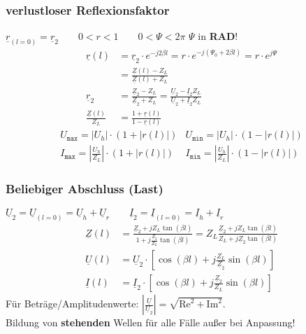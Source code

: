 \subsubsection{verlustloser Reflexionsfaktor}

$ \underline{r}_{(l=0)} = \underline{r}_2 \qquad 0<r<1 \qquad 0<\Psi<2\pi $ $\Psi$ in \textbf{RAD}!
\begin{align*}
	\underline{r}(l)  &= \underline{r}_2 \cdot e^{-j2\beta l} = r \cdot e^{-j(\Psi_0+2\beta l)} =r\cdot e^{j\Psi} \\ &=\tfrac{\underline{Z}(l)-Z_L}{\underline{Z}(l)+Z_L}\\
	\underline{r}_2 & = \tfrac{\underline{Z}_2-Z_L}{\underline{Z}_2+Z_L} = \tfrac{\underline{U}_2-\underline{I}_2Z_L}{\underline{U}_2 +\underline{I}_2 Z_L}\\
	\tfrac{\underline{Z}(l)}{Z_L} & = \tfrac{1+\underline{r}(l)}{1-\underline{r}(l)}
\end{align*}
\begin{align*}
	&U_{\texttt{max}} = |U_h| \cdot (1+|r(l)|) & U_{\texttt{min}} = |U_h| \cdot (1-|r(l)|) &\\
	&I_{\texttt{max}} = \left | \frac{U_h}{Z_L} \right | \cdot (1+|r(l)|) & I_{\texttt{min}} = \left| \frac{U_h}{Z_L} \right | \cdot (1-|r(l)|) &
\end{align*}	
\subsubsection{Beliebiger Abschluss (Last)} \label{beliebig_abschluss}
$\underline{U}_2 = \underline{U}_{(l=0)} =  \underline{U}_h  +\underline{U}_r \qquad \underline{I}_2 = \underline{I}_{(l=0)} =  \underline{I}_h  +\underline{I}_r $	
\begin{align*}
	\underline{Z}(l) & = 
	\frac{\underline{Z}_2+jZ_L\tan(\beta 
	l)}{1+ j \frac{\underline{Z}_2}{Z_L}\tan(\beta l)}
	= Z_L \frac{\underline{Z}_2 + j Z_L \tan(\beta l)}{Z_L + j \underline{Z}_2 \tan(\beta l)}\\
	\underline{U}(l) & = \underline{U}_2 \cdot \left[ \cos(\beta l) + j \tfrac{Z_L}{\underline{Z}_2} \sin(\beta l) \right] \\
	\underline{I}(l) & = \underline{I}_2 \cdot \left[ \cos(\beta l) + j \tfrac{\underline{Z}_2}{Z_L} \sin(\beta l) \right] 
\end{align*}
Für Beträge/Amplitudenwerte: \quad $\left| \frac{\underline{U}}{\underline{U}_2} \right| = \sqrt{\text{Re}^2+\text{Im}^2}  $.\\
Bildung von \textbf{stehenden} Wellen für alle Fälle außer bei Anpassung!
